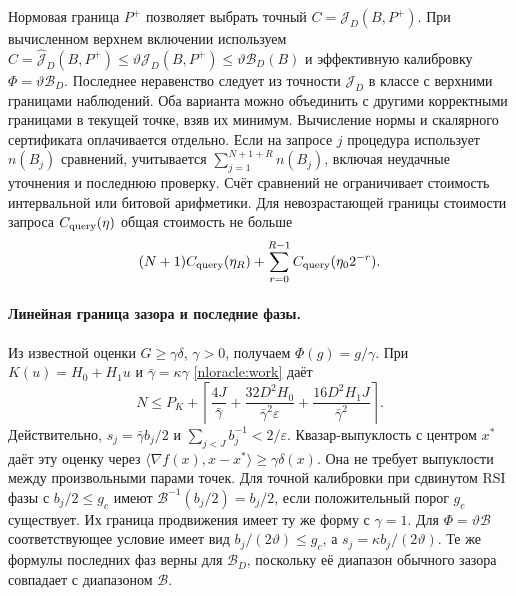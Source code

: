 Нормовая граница $P^+$ позволяет выбрать точный
$C=\mathcal J_D(B,P^+)$.
При вычисленном верхнем включении используем
$C=\widehat{\mathcal J}_D(B,P^+)\le\vartheta\mathcal J_D(B,P^+)
\le\vartheta\mathcal B_D(B)$ и эффективную калибровку
$\Phi=\vartheta\mathcal B_D$.
Последнее неравенство следует из точности $\mathcal J_D$
в классе с верхними границами наблюдений.
Оба варианта можно объединить с другими корректными границами
в текущей точке, взяв их минимум.
Вычисление нормы и скалярного сертификата оплачивается отдельно.
Если на запросе $j$ процедура использует $n(B_j)$ сравнений,
учитывается $\sum_{j=1}^{N+1+R}n(B_j)$, включая неудачные уточнения
и последнюю проверку. Счёт сравнений не ограничивает стоимость
интервальной или битовой арифметики.
Для невозрастающей границы стоимости запроса $C_{\rm query}(\eta)$
общая стоимость не больше
\[
 (N+1)C_{\rm query}(\eta_R)+\sum_{r=0}^{R-1}C_{\rm query}(\eta_0 2^{-r}).
\]

\paragraph{Линейная граница зазора и последние фазы.}
Из известной оценки $G\ge\gamma\delta$, $\gamma>0$, получаем
$\Phi(g)=g/\gamma$.
При $K(u)=H_0+H_1u$ и $\bar\gamma=\kappa\gamma$
\eqref{nloracle:work} даёт
\[
 N\le P_K+\left\lceil
 \frac{4J}{\bar\gamma}+
 \frac{32D^2H_0}{\bar\gamma^2\varepsilon}+
 \frac{16D^2H_1J}{\bar\gamma^2}\right\rceil.
\]
Действительно, $s_j=\bar\gamma b_j/2$ и
$\sum_{j<J}b_j^{-1}<2/\varepsilon$.
Квазар-выпуклость с центром $x^*$
даёт эту оценку через
$\langle\nabla f(x),x-x^*\rangle\ge\gamma\delta(x)$.
Она не требует выпуклости между произвольными парами точек.
Для точной калибровки при сдвинутом RSI фазы с $b_j/2\le g_c$
имеют $\mathcal B^{-1}(b_j/2)=b_j/2$, если положительный порог
$g_c$ существует. Их граница продвижения имеет ту же форму с $\gamma=1$.
Для $\Phi=\vartheta\mathcal B$ соответствующее условие имеет вид
$b_j/(2\vartheta)\le g_c$, а $s_j=\kappa b_j/(2\vartheta)$.
Те же формулы последних фаз верны для $\mathcal B_D$,
поскольку её диапазон обычного зазора совпадает с диапазоном $\mathcal B$.

